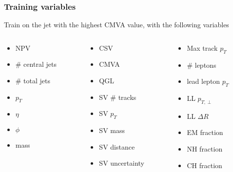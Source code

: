 \documentclass{beamer}
\begin{document}
\begin{frame}
  \frametitle{Training variables}

  Train on the jet with the highest CMVA value, with the following variables

  \begin{columns}
    \begin{column}{0.33\linewidth}
      \begin{itemize}
      \item NPV
      \item \# central jets
      \item \# total jets
      \item $p_T$
      \item $\eta$
      \item $\phi$
      \item mass
      \end{itemize}
    \end{column}
    \begin{column}{0.33\linewidth}
      \begin{itemize}
      \item CSV
      \item CMVA
      \item QGL
      \item SV \# tracks
      \item SV $p_T$
      \item SV mass
      \item SV distance
      \item SV uncertainty
      \end{itemize}
    \end{column}
    \begin{column}{0.33\linewidth}
      \begin{itemize}
      \item Max track $p_T$
      \item \# leptons
      \item lead lepton $p_T$
      \item LL $p_{T, \perp}$
      \item LL $\Delta R$
      \item EM fraction
      \item NH fraction
      \item CH fraction
      \end{itemize}
    \end{column}
  \end{columns}

\end{frame}
\end{document}
